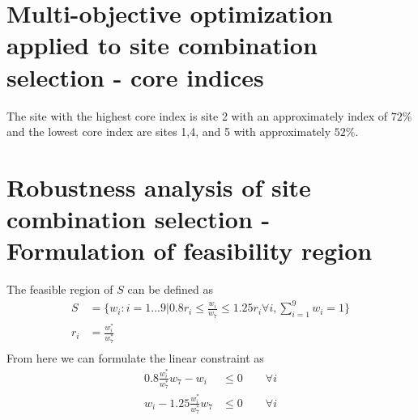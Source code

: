 \documentclass{article}
\begin{document}
\section{Multi-objective optimization applied to site combination selection - core indices}
The site with the highest core index is site 2 with an approximately index of $72\%$ and the lowest core index are sites 1,4,	 and 5 with approximately $52\%$.

\section{Robustness analysis of site combination selection - Formulation of feasibility region}
The feasible region of $S$ can be defined as 
\begin{align}
	S &= \{w_i:i=1...9|0.8r_i\leq \frac{w_i}{w_7} \leq 1.25r_i \forall i,\sum_{i=1}^{9} w_i = 1\}\\
	r_i &= \frac{w_i^*}{w_7^*}\\	
\end{align}
From here we can formulate the linear constraint as 
\begin{align}
	0.8\frac{w_i^*}{w_7^*}w_7 - w_i &\leq 0 \qquad \forall i \\
	w_i - 1.25\frac{w_i^*}{w_7^*}w_7 &\leq 0 \qquad \forall i
\end{align}
\end{document}
